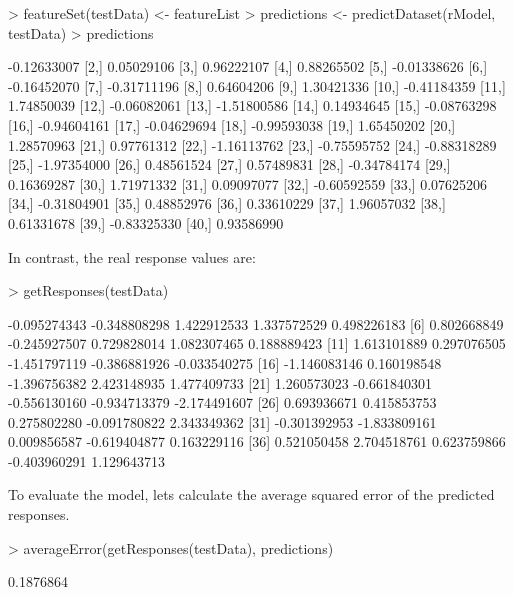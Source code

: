\documentclass{article}
\begin{document}
\begin{Schunk}
\begin{Sinput}
> featureSet(testData) <- featureList
> predictions <- predictDataset(rModel, testData)
> predictions
\end{Sinput}
\begin{Soutput}
             [,1]
 [1,] -0.12633007
 [2,]  0.05029106
 [3,]  0.96222107
 [4,]  0.88265502
 [5,] -0.01338626
 [6,] -0.16452070
 [7,] -0.31711196
 [8,]  0.64604206
 [9,]  1.30421336
[10,] -0.41184359
[11,]  1.74850039
[12,] -0.06082061
[13,] -1.51800586
[14,]  0.14934645
[15,] -0.08763298
[16,] -0.94604161
[17,] -0.04629694
[18,] -0.99593038
[19,]  1.65450202
[20,]  1.28570963
[21,]  0.97761312
[22,] -1.16113762
[23,] -0.75595752
[24,] -0.88318289
[25,] -1.97354000
[26,]  0.48561524
[27,]  0.57489831
[28,] -0.34784174
[29,]  0.16369287
[30,]  1.71971332
[31,]  0.09097077
[32,] -0.60592559
[33,]  0.07625206
[34,] -0.31804901
[35,]  0.48852976
[36,]  0.33610229
[37,]  1.96057032
[38,]  0.61331678
[39,] -0.83325330
[40,]  0.93586990
\end{Soutput}
\end{Schunk}

In contrast, the real response values are:

\begin{Schunk}
\begin{Sinput}
> getResponses(testData)
\end{Sinput}
\begin{Soutput}
 [1] -0.095274343 -0.348808298  1.422912533  1.337572529  0.498226183
 [6]  0.802668849 -0.245927507  0.729828014  1.082307465  0.188889423
[11]  1.613101889  0.297076505 -1.451797119 -0.386881926 -0.033540275
[16] -1.146083146  0.160198548 -1.396756382  2.423148935  1.477409733
[21]  1.260573023 -0.661840301 -0.556130160 -0.934713379 -2.174491607
[26]  0.693936671  0.415853753  0.275802280 -0.091780822  2.343349362
[31] -0.301392953 -1.833809161  0.009856587 -0.619404877  0.163229116
[36]  0.521050458  2.704518761  0.623759866 -0.403960291  1.129643713
\end{Soutput}
\end{Schunk}

To evaluate the model, lets calculate the average squared error
of the predicted responses.

\begin{Schunk}
\begin{Sinput}
> averageError(getResponses(testData), predictions)
\end{Sinput}
\begin{Soutput}
[1] 0.1876864
\end{Soutput}
\end{Schunk}
\end{document}
